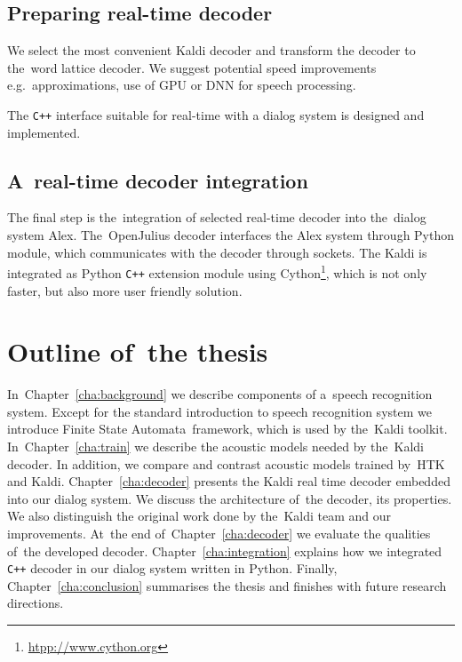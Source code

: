 \subsection{Preparing real-time decoder} 
\label{sub:compare_rt}

We select the most convenient Kaldi decoder and 
transform the decoder to the~word lattice decoder. 
We suggest potential speed improvements e.g.\ approximations, use of \ac{GPU} 
or \ac{DNN} for speech processing\cite{vesely2013sequencediscriminative}.

The \verb!C++! interface suitable for real-time with a dialog system is designed and implemented.

\subsection{A~real-time decoder integration} 
\label{sub:integration}
The final step is the~integration of selected real-time decoder into the~dialog system Alex.
The~OpenJulius decoder interfaces the Alex system through Python module, 
which communicates with the decoder through sockets.
The Kaldi is integrated as Python \verb!C++! extension module 
using Cython\footnote{\url{htpp://www.cython.org}}, 
which is not only faster, but also more user friendly solution.


\section{Outline of~the thesis} 
\label{sec:outline_of_the_thesis}
In~Chapter~\ref{cha:background} we describe components of a~speech recognition system.  
Except for the standard introduction to speech recognition system we introduce Finite State Automata~framework,
which is used by the~Kaldi toolkit. In~Chapter~\ref{cha:train} we describe the acoustic 
models needed by the~Kaldi decoder. 
In addition, we compare and contrast acoustic models trained by~\ac{HTK} and Kaldi. 
Chapter~\ref{cha:decoder} presents the Kaldi real time decoder embedded into our dialog system.
We discuss the architecture of~the decoder, its properties. 
We also distinguish the original work done by the~Kaldi team and our improvements. 
At~the end of~Chapter~\ref{cha:decoder} 
we evaluate the qualities of~the developed decoder.
Chapter~\ref{cha:integration} explains how we integrated \verb!C++! decoder in our dialog system written in Python.
Finally, Chapter~\ref{cha:conclusion} summarises the thesis and finishes with future research directions.

